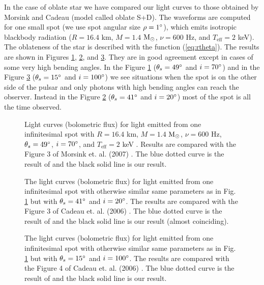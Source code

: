 \documentclass{wihuri}
\def\msun{{\rm M_{\odot}}}
\def\thetas{\theta_{s}}
\begin{document}
In the case of oblate star we have compared our light curves to those obtained by Morsink \cite{morsink} and Cadeau \cite{cadeau} (model called oblate S+D). The waveforms are computed for one small spot (we use spot angular size $\rho = 1 \degree$), which emits isotropic blackbody radiation ($R = 16.4$ km, $M = 1.4$ $\msun$, $\nu = 600$ Hz, and $T_{\mathrm{eff}} = 2$ keV). The oblateness of the star is described with the function (\ref{eq:rtheta}). The results are shown in Figures \ref{fig:mor3}, \ref{fig:cad3}, and \ref{fig:cad4}. They are in good agreement except in cases of some very high bending angles. In the Figure \ref{fig:mor3} ($\thetas = 49 \degree$ and $i = 70 \degree$) and in the Figure \ref{fig:cad4} ($\thetas = 15 \degree$ and $i = 100 \degree$) we see situations when the spot is on the other side of the pulsar and only photons with high bending angles can reach the observer. Instead in the Figure \ref{fig:cad3} ($\thetas = 41 \degree$ and $i = 20 \degree$) most of the spot is all the time observed. 


\begin{figure}
\centerline{}
\caption{Light curves (bolometric flux) for light emitted from one infinitesimal spot with $R = 16.4$ km, $M = 1.4$ $\msun$, $\nu = 600$ Hz, $\thetas = 49 \degree$, $i = 70 \degree$, and $T_{\mathrm{eff}} = 2$ keV . Results are compared with the Figure 3 of Morsink et. al. (2007) \cite{morsink}. The blue dotted curve is the result of \cite{morsink} and the black solid line is our result.
\label{fig:mor3}}
\end{figure}


\begin{figure}
\centerline{}
\caption{The light curves (bolometric flux) for light emitted from one infinitesimal spot with otherwise similar same parameters as in Fig. \ref{fig:mor3} but with $\thetas = 41 \degree$ and $i = 20 \degree$. The results are compared with the Figure 3 of Cadeau et. al. (2006) \cite{cadeau}. The blue dotted curve is the result of \cite{cadeau} and the black solid line is our result (almost coinciding).
\label{fig:cad3}}
\end{figure}


\begin{figure}
\centerline{}
\caption{The light curves (bolometric flux) for light emitted from one infinitesimal spot with otherwise similar same parameters as in Fig. \ref{fig:mor3} but with $\thetas = 15 \degree$ and $i = 100 \degree$. The results are compared with the Figure 4 of Cadeau et. al. (2006) \cite{cadeau}. The blue dotted curve is the result of \cite{cadeau} and the black solid line is our result.
\label{fig:cad4}}
\end{figure}
\end{document}
